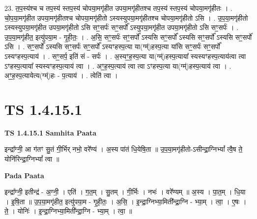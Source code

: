 \documentclass[17pt]{extarticle}
\begin{document}
23. त॒प॒स्य॑श्च च तप॒स्य॑ स्तप॒स्य॑ चोपया॒मगृ॑हीत उपया॒मगृ॑हीतश्च तप॒स्य॑ स्तप॒स्य॑ चोपया॒मगृ॑हीतः । . चो॒प॒या॒मगृ॑हीत उपया॒मगृ॑हीतश्च चोपया॒मगृ॑हीतो ऽस्यस्युपया॒मगृ॑हीतश्च चोपया॒मगृ॑हीतो ऽसि । . उ॒प॒या॒मगृ॑हीतो ऽस्यस्युपया॒मगृ॑हीत उपया॒मगृ॑हीतो ऽसि सꣳ॒॒सर्पः॑ सꣳ॒॒सर्पो᳚ ऽस्युपया॒मगृ॑हीत उपया॒मगृ॑हीतो ऽसि सꣳ॒॒सर्पः॑ । . उ॒प॒या॒मगृ॑हीत॒ इत्यु॑पया॒म - गृ॒ही॒तः॒ । . अ॒सि॒ सꣳ॒॒सर्पः॑ सꣳ॒॒सर्पो᳚ ऽस्यसि सꣳ॒॒सर्पो᳚ ऽस्यसि सꣳ॒॒सर्पो᳚ ऽस्यसि सꣳ॒॒सर्पो॑ ऽसि । . सꣳ॒॒सर्पो᳚ ऽस्यसि सꣳ॒॒सर्पः॑ सꣳ॒॒सर्पो᳚ ऽस्यꣳहस्प॒त्या या(ग्म्॑)हस्प॒त्या या॑सि सꣳ॒॒सर्पः॑ सꣳ॒॒सर्पो᳚ ऽस्यꣳहस्प॒त्याय॑ । . सꣳ॒॒सर्प॒ इति॑ सं - सर्पः॑ । . अ॒स्यꣳ॒॒ह॒स्प॒त्या या(ग्म्॑)हस्प॒त्याया᳚ स्यस्यꣳहस्प॒त्याय॑त्वा त्वा ऽꣳहस्प॒त्याया᳚ स्यस्यꣳहस्प॒त्याय॑ त्वा । . अꣳ॒॒ह॒स्प॒त्याय॑ त्वा त्वा ऽꣳहस्प॒त्या या(ग्म्॑)हस्प॒त्याय॑ त्वा । . अꣳ॒॒ह॒स्प॒त्यायेत्य(ग्म्॑)हः - प॒त्याय॑ । . त्वेति॑ त्वा । \newline
\pagebreak
{}
\section*{ TS 1.4.15.1 }

\textbf{TS 1.4.15.1 } \newline
\textbf{Samhita Paata} \newline

इन्द्रा᳚ग्नी॒ आ ग॑तꣳ सु॒तं गी॒र्भिर् नभो॒ वरे᳚ण्यं । अ॒स्य पा॑तं धि॒येषि॒ता ॥ उ॒प॒या॒मगृ॑हीतो-ऽसीन्द्रा॒ग्निभ्यां᳚ त्वै॒ष ते॒ योनि॑रिन्द्रा॒ग्निभ्यां᳚ त्वा ॥ \newline

\textbf{Pada Paata} \newline

इन्द्रा᳚ग्नी॒ इतीन्द्र॑ - अ॒ग्नी॒ । एति॑ । ग॒त॒म् । सु॒तम् । गी॒र्भिः । नभः॑ । वरे᳚ण्यम् ॥ अ॒स्य । पा॒त॒म् । धि॒या । इ॒षि॒ता ॥ उ॒प॒या॒मगृ॑हीत॒ इत्यु॑पया॒म - गृ॒ही॒तः॒ । अ॒सि॒ । इ॒न्द्रा॒ग्निभ्या॒मिती᳚न्द्रा॒ग्नि - भ्या॒म् । त्वा॒ । ए॒षः । ते॒ । योनिः॑ । इ॒न्द्रा॒ग्निभ्या॒मिती᳚न्द्रा॒ग्नि - भ्या॒म् । त्वा॒ ॥  \newline
\end{document}
